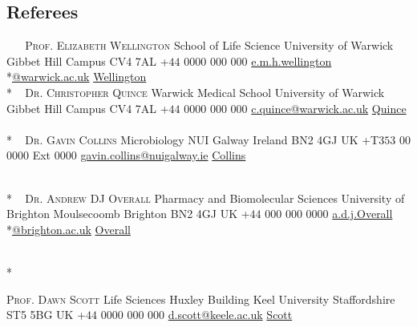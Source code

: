 \documentclass[hidelinks]{james-cv} %
\begin{document}
\begin{aside1}
\color{gray}\headingfontcontact
\section{Referees}
~
~
\normalsize\color{gray}\bodyfontsc\textsc{Prof. Elizabeth Wellington}
\bodyfontcontact\normalsize
School of Life Science
University of Warwick
Gibbet Hill Campus
CV4 7AL
+$44$ $0000$ $000$ $000$ \Phone
\footnotesize\mail\href{mailto:e.m.h.wellington@warwick.ac.uk}{e.m.h.wellington}\\*\href{mailto:e.m.h.wellington@warwick.ac.uk}{@warwick.ac.uk} \Envelope
\color{blue}\href{https://warwick.ac.uk/fac/sci/lifesci/research/wrg/} {Wellington}
~
\\*
~
\color{gray}\normalsize\bodyfontsc\textsc{Dr. Christopher Quince}
\bodyfontcontact\normalsize
Warwick Medical School
University of Warwick
Gibbet Hill Campus
CV4 7AL
+$44$ $0000$ $000$ $000$ \Phone
\footnotesize\mail\href{mailto:c.quince@warwick.ac.uk}{c.quince@warwick.ac.uk} \Envelope 
\color{blue}\href{https://warwick.ac.uk/fac/sci/med/staff/cquince/}{Quince}
~
\\*
~
\color{gray}\normalsize\bodyfontsc\textsc{Dr. Gavin Collins}
\bodyfontcontact\normalsize
Microbiology
NUI Galway
Ireland
BN2 4GJ
UK
+T$353$ $00$ $0000$ Ext $0000$ \Phone
\footnotesize\mail\href{mailto:gavin.collins@nuigalway.ie}{gavin.collins@nuigalway.ie} \Envelope 
\color{blue}\href{https://www.nuigalway.ie/our-research/people/natural-sciences/gavincollins/}{Collins}

~
\\*
~
\color{gray}\normalsize\bodyfontsc\textsc{Dr. Andrew DJ Overall}
\bodyfontcontact\normalsize
Pharmacy and Biomolecular Sciences
University of Brighton
Moulsecoomb
Brighton
BN2 4GJ
UK
+$44$ $000$ $000$ $0000$ \Phone
\footnotesize\mail\href{mailto:A.D.J.Overall@brighton.ac.uk}{a.d.j.Overall}\\*\href{mailto:A.D.J.Overall@brighton.ac.uk}{@brighton.ac.uk} \Envelope
\color{blue}\href{https://research.brighton.ac.uk/en/persons/andrew-overall}{Overall}

~
\\*
~

\color{gray}\bodyfontsc\normalsize\textsc{Prof. Dawn Scott}
\bodyfontcontact\normalsize
Life Sciences
Huxley Building
Keel University
Staffordshire
ST5 5BG
UK
+$44$ $0000$ $000$ $000$ \Phone
\footnotesize\mail\href{mailto:d.scott@keele.ac.uk}{d.scott@keele.ac.uk} \Envelope
\color{blue}\href{https://www.keele.ac.uk/lifesci/ourpeople/dawnscott/}{Scott}

\end{aside1}
\end{document}
